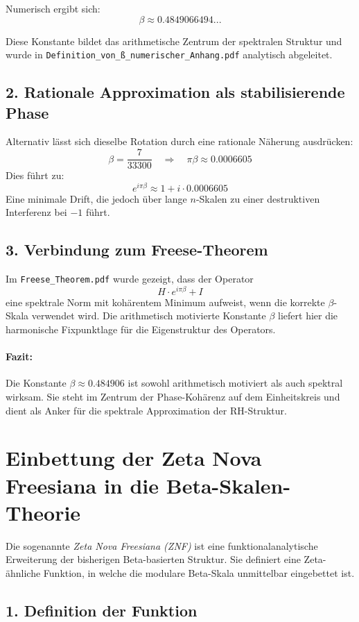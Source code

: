 \documentclass[a4paper,12pt]{article}
\begin{document}
\begin{center}
Numerisch ergibt sich:
\[
\beta \approx 0.4849066494...
\]

Diese Konstante bildet das arithmetische Zentrum der spektralen Struktur und wurde in \texttt{Definition\_von\_ß\_numerischer\_Anhang.pdf} analytisch abgeleitet.

\subsection*{2. Rationale Approximation als stabilisierende Phase}

Alternativ lässt sich dieselbe Rotation durch eine rationale Näherung ausdrücken:
\[
\beta = \frac{7}{33300} \quad \Rightarrow \quad \pi \beta \approx 0.0006605
\]
Dies führt zu:
\[
e^{i \pi \beta} \approx 1 + i \cdot 0.0006605
\]
Eine minimale Drift, die jedoch über lange \(n\)-Skalen zu einer destruktiven Interferenz bei \( -1 \) führt.

\subsection*{3. Verbindung zum Freese-Theorem}

Im \texttt{Freese\_Theorem.pdf} wurde gezeigt, dass der Operator
\[
H \cdot e^{i \pi \beta} + I
\]
eine spektrale Norm mit kohärentem Minimum aufweist, wenn die korrekte \(\beta\)-Skala verwendet wird. Die arithmetisch motivierte Konstante \(\beta\) liefert hier die harmonische Fixpunktlage für die Eigenstruktur des Operators.

\paragraph{Fazit:}
Die Konstante \(\beta \approx 0.484906\) ist sowohl arithmetisch motiviert als auch spektral wirksam. Sie steht im Zentrum der Phase-Kohärenz auf dem Einheitskreis und dient als Anker für die spektrale Approximation der RH-Struktur.

\section{Einbettung der Zeta Nova Freesiana in die Beta-Skalen-Theorie}

Die sogenannte \textit{Zeta Nova Freesiana (ZNF)} ist eine funktionalanalytische Erweiterung der bisherigen Beta-basierten Struktur. Sie definiert eine Zeta-ähnliche Funktion, in welche die modulare Beta-Skala unmittelbar eingebettet ist.

\subsection*{1. Definition der Funktion}


\end{center}
\end{document}
